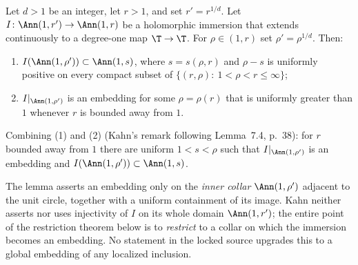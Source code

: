 \begin{lemma}\label{lem:kahn-ann-immerse}
Let \(d>1\) be an integer, let \(r>1\), and set \(r'=r^{1/d}\).  Let
\(I\colon\Ann(1,r')\to\Ann(1,r)\) be a holomorphic immersion that
extends continuously to a degree-one map \(\T\to\T\).  For
\(\rho\in(1,r)\) set \(\rho'=\rho^{1/d}\).  Then:
\begin{enumerate}
\item \(I(\Ann(1,\rho'))\subset\Ann(1,s)\), where \(s=s(\rho,r)\) and
\(\rho-s\) is uniformly positive on every compact subset of
\(\{(r,\rho):\ 1<\rho<r\le\infty\}\);
\item \(I|_{\Ann(1,\rho')}\) is an embedding for some \(\rho=\rho(r)\)
that is uniformly greater than \(1\) whenever \(r\) is bounded away
from \(1\).
\end{enumerate}
Combining (1) and (2) (Kahn's remark following Lemma~7.4, p.~38): for \(r\) bounded
away from \(1\) there are uniform \(1<s<\rho\) such that
\(I|_{\Ann(1,\rho')}\) is an embedding and
\(I(\Ann(1,\rho'))\subset\Ann(1,s)\).
\end{lemma}

\begin{remark}\label{rem:ann-immerse-scope}
The lemma asserts an embedding only on the \emph{inner collar}
\(\Ann(1,\rho')\) adjacent to the unit circle, together with a uniform
containment of its image.  Kahn neither asserts nor uses injectivity of
\(I\) on its whole domain \(\Ann(1,r')\); the entire point of the
restriction theorem below is to \emph{restrict} to a collar on which
the immersion becomes an embedding.  No statement in the locked source
upgrades this to a global embedding of any localized inclusion.
\end{remark}

